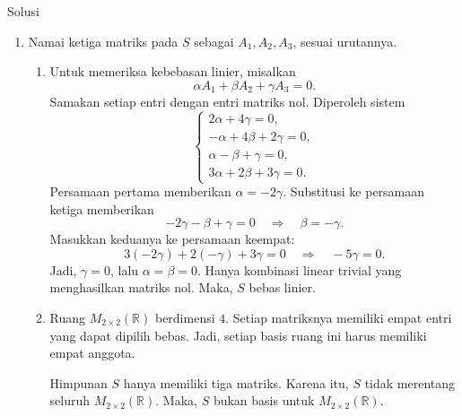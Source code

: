 \documentclass[11pt,a4paper]{article}
\newcommand{\R}{\mathbb{R}}
\begin{document}
\begin{center}
  Solusi
\end{center}
\begin{enumerate}[itemsep=12pt,parsep=5pt]
  \item Namai ketiga matriks pada $S$ sebagai $A_1,A_2,A_3$, sesuai urutannya.
        \begin{enumerate}
          \item Untuk memeriksa kebebasan linier, misalkan
                \[
                  \alpha A_1+\beta A_2+\gamma A_3=0.
                \]
                Samakan setiap entri dengan entri matriks nol.
                Diperoleh sistem
                \[
                  \begin{cases}
                    2\alpha+4\gamma=0,        \\
                    -\alpha+4\beta+2\gamma=0, \\
                    \alpha-\beta+\gamma=0,    \\
                    3\alpha+2\beta+3\gamma=0.
                  \end{cases}
                \]
                Persamaan pertama memberikan $\alpha=-2\gamma$.
                Substitusi ke persamaan ketiga memberikan
                \[
                  -2\gamma-\beta+\gamma=0
                  \quad\Longrightarrow\quad\beta=-\gamma.
                \]
                Masukkan keduanya ke persamaan keempat:
                \[
                  3(-2\gamma)+2(-\gamma)+3\gamma=0
                  \quad\Longrightarrow\quad-5\gamma=0.
                \]
                Jadi, $\gamma=0$, lalu $\alpha=\beta=0$.
                Hanya kombinasi linear trivial yang menghasilkan matriks nol.
                Maka, $S$ bebas linier.

          \item Ruang $M_{2\times2}(\R)$ berdimensi $4$.
                Setiap matriksnya memiliki empat entri yang dapat dipilih bebas.
                Jadi, setiap basis ruang ini harus memiliki empat anggota.

                Himpunan $S$ hanya memiliki tiga matriks.
                Karena itu, $S$ tidak merentang seluruh $M_{2\times2}(\R)$.
                Maka, $S$ bukan basis untuk $M_{2\times2}(\R)$.
        \end{enumerate}


\end{enumerate}
\end{document}
